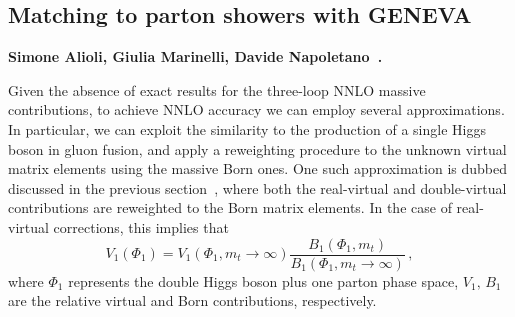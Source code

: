 \subsection{Matching to parton showers with GENEVA}


\textbf{Simone Alioli, Giulia Marinelli, Davide Napoletano~\cite{Alioli:2025xcu}.}

\noindent Given the absence of exact results for the three-loop NNLO massive contributions,
to achieve NNLO accuracy we can employ several approximations.
In particular, we can exploit the similarity to the production of a single Higgs boson
in gluon fusion, and apply a reweighting procedure to the unknown virtual matrix
elements using the massive Born ones.
One such approximation is dubbed \ftapprox discussed in the previous section~\cite{Frederix:2014hta,Maltoni:2014eza,Grazzini:2018bsd}, where both the real-virtual and double-virtual contributions
are reweighted to the Born matrix elements.
In the case of real-virtual corrections, this implies that
\begin{equation}
  V_{1}\left(\Phi_1\right) = V_{1}\left(\Phi_1,m_t\to\infty\right)
  \frac{B_1\left(\Phi_1,m_t\right)}
  {B_1\left(\Phi_1,m_t\to\infty\right)}\,,
\end{equation}
where $\Phi_1$ represents the double Higgs boson plus one parton phase space, $V_1,\, B_1$
are the relative virtual and Born contributions, respectively.

